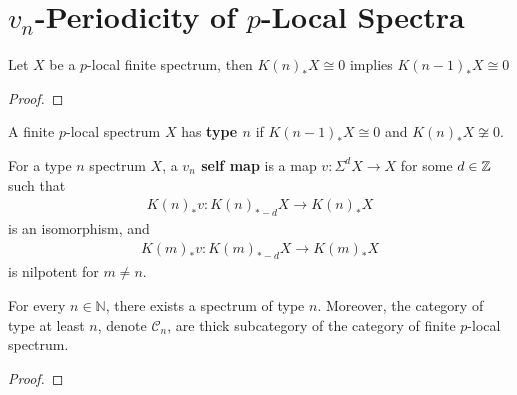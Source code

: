 \section{$v_n$-Periodicity of $p$-Local Spectra}\label{sec:chromatic-more-periodicity}
\begin{proposition}
    Let $X$ be a $p$-local finite spectrum, then $K(n)_*X\cong 0$ implies $K(n-1)_*X\cong 0$
\end{proposition}
\begin{proof}

\end{proof}

\begin{definition}
    A finite $p$-local spectrum $X$ has \textbf{type $n$} if $K(n-1)_*X\cong 0$ and $K(n)_*X\not \cong 0$.

    For a type $n$ spectrum $X$, a \textbf{$v_n$ self map} is a map $v: \Sigma^{d}X\to X$ for some $d\in \mathbb{Z}$ such that 
    \begin{align*}
        K(n)_*v: K(n)_{*-d}X\to K(n)_* X
    \end{align*}is an isomorphism, and 
    \begin{align*}
        K(m)_*v: K(m)_{*-d}X\to K(m)_* X
    \end{align*}is nilpotent for $m\neq n$.
\end{definition}

\begin{proposition}
    For every $n\in \mathbb{N}$, there exists a spectrum of type $n$. Moreover, the category of type at least $n$, denote $\mathcal{C}_n$, 
    are thick subcategory of the category of finite $p$-local spectrum.
\end{proposition}
\begin{proof}

\end{proof}